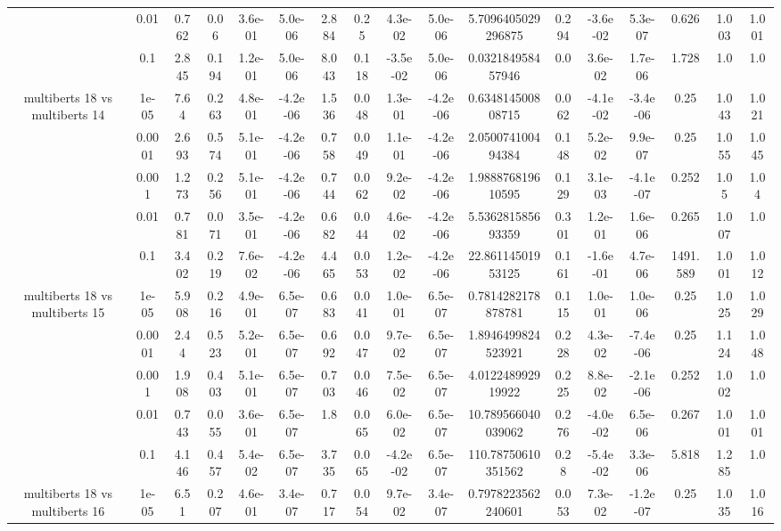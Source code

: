 \begin{tabular}{|c|c|c|c|c|c|c|c|c|c|c|c|c|c|c|c|c|}
 & 0.01 & 0.762 & 0.06 & 3.6e-01 & 5.0e-06 & 2.884 & 0.25 & 4.3e-02 & 5.0e-06 & 5.7096405029296875 & 0.294 & -3.6e-02 & 5.3e-07 & 0.626 & 1.003 & 1.001 \\
 & 0.1 & 2.845 & 0.194 & 1.2e-01 & 5.0e-06 & 8.043 & 0.118 & -3.5e-02 & 5.0e-06 & 0.032184958457946 & 0.0 & 3.6e-02 & 1.7e-06 & 1.728 & 1.0 & 1.0 \\
\hline
\multirow{5}{*}{multiberts 18 vs multiberts 14} & 1e-05 & 7.64 & 0.263 & 4.8e-01 & -4.2e-06 & 1.536 & 0.048 & 1.3e-01 & -4.2e-06 & 0.634814500808715 & 0.062 & -4.1e-02 & -3.4e-06 & 0.25 & 1.043 & 1.021 \\
 & 0.0001 & 2.693 & 0.574 & 5.1e-01 & -4.2e-06 & 0.758 & 0.049 & 1.1e-01 & -4.2e-06 & 2.050074100494384 & 0.148 & 5.2e-02 & 9.9e-07 & 0.25 & 1.055 & 1.045 \\
 & 0.001 & 1.273 & 0.256 & 5.1e-01 & -4.2e-06 & 0.744 & 0.062 & 9.2e-02 & -4.2e-06 & 1.988876819610595 & 0.129 & 3.1e-03 & -4.1e-07 & 0.252 & 1.05 & 1.04 \\
 & 0.01 & 0.781 & 0.071 & 3.5e-01 & -4.2e-06 & 0.682 & 0.044 & 4.6e-02 & -4.2e-06 & 5.536281585693359 & 0.301 & 1.2e-01 & 1.6e-06 & 0.265 & 1.007 & 1.0 \\
 & 0.1 & 3.402 & 0.219 & 7.6e-02 & -4.2e-06 & 4.465 & 0.053 & 1.2e-02 & -4.2e-06 & 22.86114501953125 & 0.161 & -1.6e-01 & 4.7e-06 & 1491.589 & 1.001 & 1.012 \\
\hline
\multirow{5}{*}{multiberts 18 vs multiberts 15} & 1e-05 & 5.908 & 0.216 & 4.9e-01 & 6.5e-07 & 0.683 & 0.041 & 1.0e-01 & 6.5e-07 & 0.7814282178878781 & 0.115 & 1.0e-01 & 1.0e-06 & 0.25 & 1.025 & 1.029 \\
 & 0.0001 & 2.44 & 0.523 & 5.2e-01 & 6.5e-07 & 0.692 & 0.047 & 9.7e-02 & 6.5e-07 & 1.8946499824523921 & 0.228 & 4.3e-02 & -7.4e-06 & 0.25 & 1.124 & 1.048 \\
 & 0.001 & 1.908 & 0.403 & 5.1e-01 & 6.5e-07 & 0.703 & 0.046 & 7.5e-02 & 6.5e-07 & 4.012248992919922 & 0.225 & 8.8e-02 & -2.1e-06 & 0.252 & 1.002 & 1.0 \\
 & 0.01 & 0.743 & 0.055 & 3.6e-01 & 6.5e-07 & 1.8 & 0.065 & 6.0e-02 & 6.5e-07 & 10.789566040039062 & 0.276 & -4.0e-02 & 6.5e-06 & 0.267 & 1.001 & 1.001 \\
 & 0.1 & 4.146 & 0.457 & 5.4e-02 & 6.5e-07 & 3.735 & 0.065 & -4.2e-02 & 6.5e-07 & 110.78750610351562 & 0.28 & -5.4e-02 & 3.3e-06 & 5.818 & 1.285 & 1.0 \\
\hline
\multirow{5}{*}{multiberts 18 vs multiberts 16} & 1e-05 & 6.51 & 0.207 & 4.6e-01 & 3.4e-07 & 0.717 & 0.054 & 9.7e-02 & 3.4e-07 & 0.7978223562240601 & 0.053 & 7.3e-02 & -1.2e-07 & 0.25 & 1.035 & 1.016 \\

\end{tabular}
